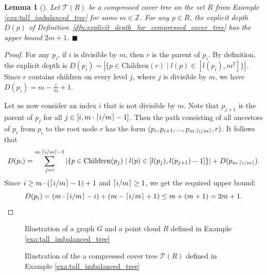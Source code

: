 \documentclass[a4paper,UKenglish,cleveref, autoref]{lipics-v2019}
\numberwithin{algocf}{section}
\theoremstyle{definition}
\theoremstyle{definition}
\theoremstyle{definition}
\theoremstyle{plain}
\newtheorem{lem}[algocf]{Lemma}
\DeclarePairedDelimiter\ceil{\lceil}{\rceil}
\newcommand{\Child}{\mathrm{Children}}
\newcommand{\Z}{\mathbb{Z}}
\newcommand{\T}{\mathcal{T}}
\newcommand{\bs}{\hfill $\blacksquare$}
\begin{document}
\begin{lem}[{\cite[Lemma~3.3]{elkin2021new}}]
\label{lem:tall_imbalanced_tree_explicit_depth}
Let $\T(R)$ be a compressed cover tree on the set $R$ from Example \ref{exa:tall_imbalanced_tree} for some $m \in \Z$. 
For any $p \in R$, the explicit depth $D(p)$ of Definition~\ref{dfn:explicit_depth_for_compressed_cover_tree} has the upper bound $2m+1$. 
\bs
\end{lem}
\begin{proof}
For any $p_i$, if $i$ is divisible by $m$, then $r$ is the parent of $p_i$. By definition, the explicit depth is $D(p_i) = |\{p \in \Child(r) \mid l(p) \in [l(p_i), m^2] \} |$. 
Since $r$ contains children on every level $j$, where $j$ is divisible by $m$, we have $D(p_i) =  m - \frac{i}{m} + 1$. 
\medskip

Let us now consider an index $i$ that is not divisible by $m$. 
Note that  $p_{j+1}$ is the parent of $p_j$ for all $j \in [i, m \cdot \ceil{i / m} - 1]$.  
Then the path consisting of all ancestors of $p_i$ from $p_i$ to the root node $r$ has the form $(p_{i}, p_{i+1}, ..., p_{m \cdot \ceil{i / m}} , r)$. It follows that
$$D(p_i) = \sum^{m \cdot \ceil{i / m} -1}_{j = i}| \{p \in \Child(p_j) \mid l(p) \in [l(p_{j}), l(p_{j+1}) - 1] \}| + D(p_{m \cdot \ceil{i / m}}).
 $$
Since $i \geq m \cdot (\ceil{i / m} -1) + 1 $ and $\ceil{i / m} \geq 1$, we get the required upper bound: $$D(p_i) =  (m \cdot  \ceil{i / m} - i ) + (m - \ceil{i / m} + 1) \leq m + (m+1) = 2m + 1.$$ 
\end{proof}

\begin{figure}
    \centering
    
    \caption{Illustration of a graph $G$ and a point cloud $R$ defined in Example \ref{exa:tall_imbalanced_tree}}
    \label{fig:GraphConstructionOfExample}
\end{figure}

\begin{figure}
    \centering
    
    \caption{Illustration of the a compressed cover tree $\T(R)$ defined in Example \ref{exa:tall_imbalanced_tree}}
    \label{fig:bad_cover_tree}
\end{figure}
\end{document}
